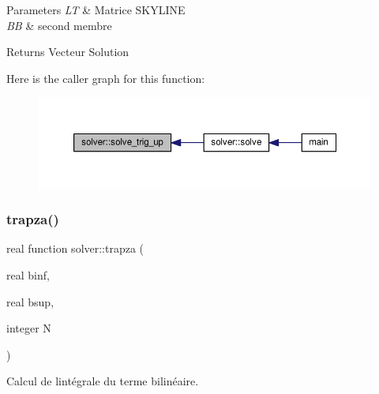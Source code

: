 \begin{DoxyParams}{Parameters}
{\em LT} & Matrice S\+K\+Y\+L\+I\+NE \\
\hline
{\em BB} & second membre \\
\hline
\end{DoxyParams}
\begin{DoxyReturn}{Returns}
Vecteur Solution 
\end{DoxyReturn}
Here is the caller graph for this function\+:
\nopagebreak
\begin{figure}[H]
\begin{center}
\leavevmode
\includegraphics[width=350pt]{namespacesolver_a08b8f70c86d7bf39b32ce8fdcc872fd4_icgraph}
\end{center}
\end{figure}
\mbox{\label{namespacesolver_a5cdc774a6979796cb6b072b2fbb0e5af}} 
\subsubsection{\texorpdfstring{trapza()}{trapza()}}
{\footnotesize\ttfamily real function solver\+::trapza (\begin{DoxyParamCaption}\item[{real}]{binf,  }\item[{real}]{bsup,  }\item[{integer}]{N }\end{DoxyParamCaption})}



Calcul de l\textquotesingle{}intégrale du terme bilinéaire. 



